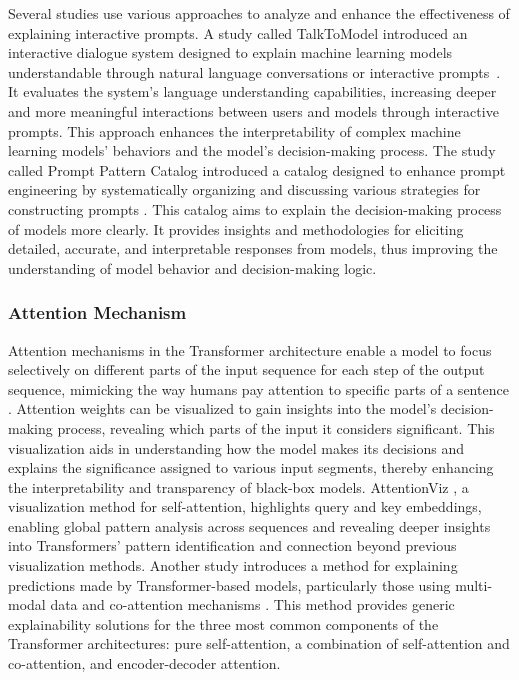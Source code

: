 \documentclass[final,5p,times,twocolumn]{elsarticle}
\begin{document}
Several studies use various approaches to analyze and enhance the effectiveness of explaining interactive prompts. A study called TalkToModel introduced an interactive dialogue system designed to explain machine learning models understandable through natural language conversations or interactive prompts~\cite{slack2023explaining}. It evaluates the system's language understanding capabilities, increasing deeper and more meaningful interactions between users and models through interactive prompts. This approach enhances the interpretability of complex machine learning models' behaviors and the model’s decision-making process. The study called Prompt Pattern Catalog introduced a catalog designed to enhance prompt engineering by systematically organizing and discussing various strategies for constructing prompts \cite{white2023prompt}. This catalog aims to explain the decision-making process of models more clearly. It provides insights and methodologies for eliciting detailed, accurate, and interpretable responses from models, thus improving the understanding of model behavior and decision-making logic.

\subsubsection{Attention Mechanism}

Attention mechanisms in the Transformer architecture enable a model to focus selectively on different parts of the input sequence for each step of the output sequence, mimicking the way humans pay attention to specific parts of a sentence \cite{vaswani2017attention}. Attention weights can be visualized to gain insights into the model's decision-making process, revealing which parts of the input it considers significant. This visualization aids in understanding how the model makes its decisions and explains the significance assigned to various input segments, thereby enhancing the interpretability and transparency of black-box models. AttentionViz \cite{yeh2023attentionviz}, a visualization method for self-attention, highlights query and key embeddings, enabling global pattern analysis across sequences and revealing deeper insights into Transformers' pattern identification and connection beyond previous visualization methods. Another study introduces a method for explaining predictions made by Transformer-based models, particularly those using multi-modal data and co-attention mechanisms \cite{chefer2021generic}. This method provides generic explainability solutions for the three most common components of the Transformer architectures: pure self-attention, a combination of self-attention and co-attention, and encoder-decoder attention.
\end{document}
